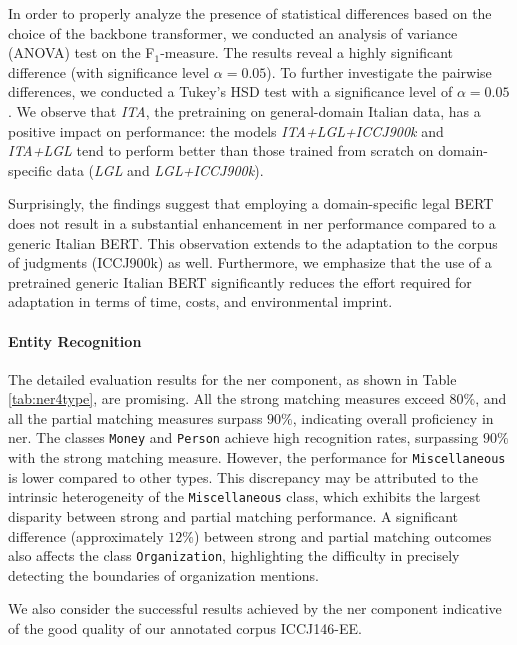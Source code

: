 In order to properly analyze the presence of statistical differences based on the choice of the backbone transformer, we conducted an analysis of variance (ANOVA) test on the F$_1$-measure. The results reveal a highly significant difference (with significance level $\alpha=0.05$). To further investigate the pairwise differences, we conducted a Tukey's HSD test with a significance level of $\alpha=0.05$. We observe that \textit{ITA}, the pretraining on general-domain Italian data, has a positive impact on performance: the models \textit{ITA+LGL+ICCJ900k} and \textit{ITA+LGL} tend to perform better than those trained from scratch on domain-specific data (\textit{LGL} and \textit{LGL+ICCJ900k}).

Surprisingly, the findings suggest that employing a domain-specific legal BERT does not result in a substantial enhancement in \ac{ner} performance compared to a generic Italian BERT. This observation extends to the adaptation to the corpus of judgments (ICCJ900k) as well. Furthermore, we emphasize that the use of a pretrained generic Italian BERT significantly reduces the effort required for adaptation in terms of time, costs, and environmental imprint.



\paragraph{Entity Recognition}

The detailed evaluation results for the \ac{ner} component, as shown in Table \ref{tab:ner4type}, are promising. All the strong matching measures exceed $80\%$, and all the partial matching measures surpass $90\%$, indicating overall proficiency in \acl{ner}. The classes \texttt{Money} and \texttt{Person} achieve high recognition rates, surpassing $90\%$ with the strong matching measure. However, the performance for \texttt{Miscellaneous} is lower compared to other types. This discrepancy may be attributed to the intrinsic heterogeneity of the \texttt{Miscellaneous} class, which exhibits the largest disparity between strong and partial matching performance. A significant difference (approximately $12\%$) between strong and partial matching outcomes also affects the class \texttt{Organization}, highlighting the difficulty in precisely detecting the boundaries of organization mentions.

We also consider the successful results achieved by the \ac{ner} component indicative of the good quality of our annotated corpus ICCJ146-EE.

